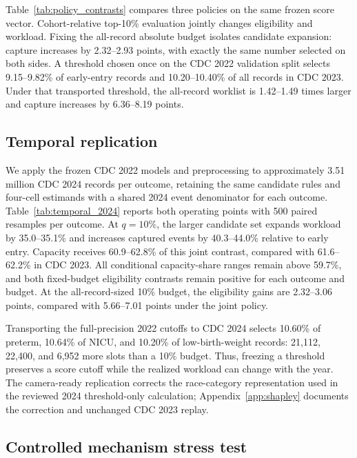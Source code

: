 \documentclass{article}
\begin{document}
Table~\ref{tab:policy_contrasts} compares three policies on the same frozen
score vector. Cohort-relative top-10\% evaluation jointly changes eligibility
and workload. Fixing the all-record absolute budget isolates candidate
expansion: capture increases by 2.32--2.93 points, with exactly the same number
selected on both sides. A threshold chosen once on the CDC 2022 validation
split selects 9.15--9.82\% of early-entry records and 10.20--10.40\% of all
records in CDC 2023. Under that transported threshold, the all-record worklist
is 1.42--1.49 times larger and capture increases by 6.36--8.19 points.



\subsection{Temporal replication}
\label{sec:temporal_replication}

We apply the frozen CDC 2022 models and preprocessing to approximately
3.51 million CDC 2024 records per outcome, retaining the same candidate rules
and four-cell estimands with a shared 2024 event denominator for each outcome.
Table~\ref{tab:temporal_2024}
reports both operating points with 500 paired resamples per outcome.
At $q=10\%$, the larger candidate set expands workload by 35.0--35.1\%
and increases captured events by 40.3--44.0\% relative to early entry.
Capacity receives 60.9--62.8\% of this joint contrast, compared with
61.6--62.2\% in CDC 2023. All conditional capacity-share ranges remain above
59.7\%, and both fixed-budget eligibility contrasts remain positive for each
outcome and budget. At the all-record-sized 10\% budget, the eligibility gains
are 2.32--3.06 points, compared with 5.66--7.01 points under the joint policy.



Transporting the full-precision 2022 cutoffs to CDC 2024 selects 10.60\% of
preterm, 10.64\% of NICU, and 10.20\% of low-birth-weight records: 21,112,
22,400, and 6,952 more slots than a 10\% budget. Thus, freezing a threshold
preserves a score cutoff while the realized workload can change with the year.
The camera-ready replication corrects the race-category representation used
in the reviewed 2024 threshold-only calculation; Appendix~\ref{app:shapley}
documents the correction and unchanged CDC 2023 replay.

\subsection{Controlled mechanism stress test}
\end{document}
